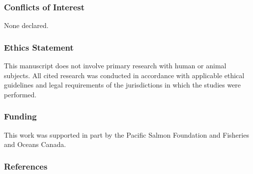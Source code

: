\documentclass[
  letterpaper,
  DIV=11,
  numbers=noendperiod]{scrartcl}
\begin{document}
\subsubsection{Conflicts of Interest}\label{conflicts-of-interest}

None declared.

\subsubsection{Ethics Statement}\label{ethics-statement}

This manuscript does not involve primary research with human or animal
subjects. All cited research was conducted in accordance with applicable
ethical guidelines and legal requirements of the jurisdictions in which
the studies were performed.

\subsubsection{Funding}\label{funding}

This work was supported in part by the Pacific Salmon Foundation and
Fisheries and Oceans Canada.

\subsubsection{References}\label{references}
\end{document}
